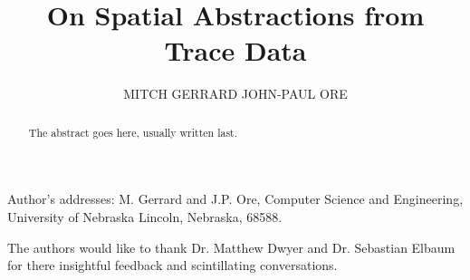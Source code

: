 \documentclass[prodmode,acmtecs]{acmsmall} %
\begin{document}

\title{On Spatial Abstractions from Trace Data}
\author{MITCH GERRARD
JOHN-PAUL ORE
}

\begin{abstract}
The abstract goes here, usually written last.
\end{abstract}




\begin{bottomstuff}


Author's addresses: M. Gerrard and J.P. Ore, Computer Science and Engineering,
University of Nebraska
Lincoln, Nebraska, 68588. 
\end{bottomstuff}

\maketitle













\begin{acks}
  The authors would like to thank Dr. Matthew Dwyer and Dr. Sebastian Elbaum for there insightful feedback and scintillating conversations.
\end{acks}




\end{document}
